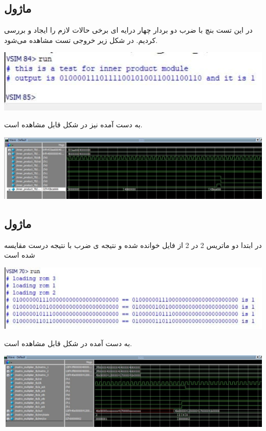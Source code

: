 \documentclass[12pt,titlepage,a4page , tikz , multi,table , svgnames,xcdraw]{article}
\begin{document}
\subsection{ماژول }
در این تست بنچ با ضرب دو بردار چهار درایه ای برخی حالات لازم را ایجاد و بررسی کردیم.
در شکل زیر خروجی تست مشاهده می‌شود.
\begin{center}
\includegraphics[scale=0.45]
    {Images/Test Bench/inner_product_test_bench.png}
\end{center}
 به دست آمده نیز در شکل قابل مشاهده است.
\begin{center}
\includegraphics[scale=0.45]
    {Images/Test Bench/inner_product_waveform.jpg}
\end{center}


\subsection{ماژول }
 در ابتدا دو ماتریس 2 در 2 از فایل خوانده شده و نتیجه ی ضرب با نتیجه درست مقایسه شده است
\begin{center}
\includegraphics[scale=0.75]
    {Images/Test Bench/matrix_multiplier_test_bench_1.png}
\end{center}
 به دست آمده در شکل قابل مشاهده است.
\begin{center}
\includegraphics[scale=0.46]
    {Images/Test Bench/matrix_multiplier_waveform_1.jpg}
\end{center}
\end{document}
